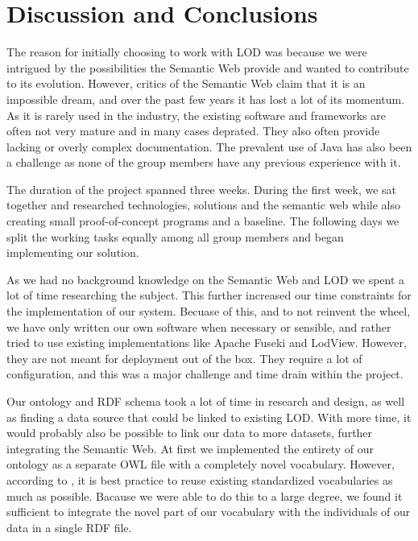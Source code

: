 \chapter{Discussion and Conclusions}

The reason for initially choosing to work with LOD was because we were intrigued by the possibilities the Semantic Web provide and wanted to contribute to its evolution. However, critics of the Semantic Web claim that it is an impossible dream, and over the past few years it has lost a lot of its momentum. As it is rarely used in the industry, the existing software and frameworks are often not very mature and in many cases deprated. They also often provide lacking or overly complex documentation. The prevalent use of Java has also been a challenge as none of the group members have any previous experience with it. 

\vspace{5mm}

The duration of the project spanned three weeks. During the first week, we sat together and researched technologies, solutions and the semantic web while also creating small proof-of-concept programs and a baseline. The following days we split the working tasks equally among all group members and began implementing our solution.

\vspace{5mm}

As we had no background knowledge on the Semantic Web and LOD we spent a lot of time researching the subject. This further increased our time constraints for the implementation of our system. Becuase of this, and to not reinvent the wheel, we have only written our own software when necessary or sensible, and rather tried to use existing implementations like Apache Fuseki and LodView. However, they are not meant for deployment out of the box. They require a lot of configuration, and this was a major challenge and time drain within the project.

\vspace{5mm}

Our ontology and RDF schema took a lot of time in research and design, as well as finding a data source that could be linked to existing LOD. With more time, it would probably also be possible to link our data to more datasets, further integrating the Semantic Web. At first we implemented the entirety of our ontology as a separate OWL file with a completely novel vocabulary. However, according to \cite{w3-best-practices}, it is best practice to reuse existing standardized vocabularies as much as possible. Bacause we were able to do this to a large degree, we found it sufficient to integrate the novel part of our vocabulary with the individuals of our data in a single RDF file.

